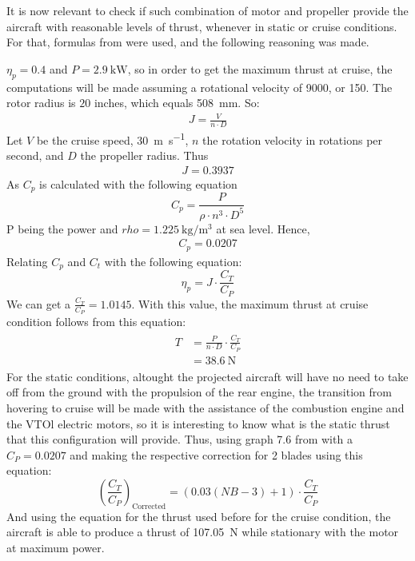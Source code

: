 \documentclass[english,fira]{ist-report}
\begin{document}
It is now relevant to check if such combination of motor and propeller provide the aircraft with reasonable levels of thrust, whenever in static or cruise conditions. For that, formulas from  \cite{corke} were used, and the following reasoning was made. 

$\eta_p=0.4$ and $P = \SI{2.9}{\kilo\watt}$, so in order to get the maximum thrust at cruise, the computations will be made assuming a rotational velocity of \SI{9000}{\rpm}, or \SI{150}{\rps}. The rotor radius is $20$ inches, which equals \SI{508}{\milli\meter}. So:
\begin{gather}
    J=\frac{V}{n \cdot D}
\end{gather}
Let $V$ be the cruise speed, \SI{30}{\meter\per\second}, $n$ the rotation velocity in rotations per second, and $D$ the propeller radius. Thus
\begin{gather}
    J=0.3937
\end{gather}
As $C_p$ is calculated with the following equation
\begin{equation}
    C_p=\frac{P}{\rho \cdot n^3 \cdot D^5}
\end{equation}
P being the power and $rho = \SI{1.225}{\kilogram\per\meter\cubed}$ at sea level. Hence,
\begin{gather}
    C_p=0.0207
\end{gather}
Relating $C_p$ and $C_t$ with the following equation:
\begin{equation}
    \eta_p=J \cdot \frac{C_T}{C_P}
\end{equation}
We can get a $\frac{C_T}{C_P}=1.0145$. With this value, the maximum thrust at cruise condition follows from this equation: 
\begin{align}
    \begin{aligned}
	    T&=\frac{P}{n \cdot D} \cdot \frac{C_T}{C_P} \\
	    &= \SI{38.6}{\newton}
	\end{aligned}
\end{align}
For the static conditions, altought the projected aircraft will have no need to take off from the ground with the propulsion of the rear engine, the transition from hovering to cruise will be made with the assistance of the combustion engine and the VTOl electric motors, so it is interesting to know what is the static thrust that this configuration will provide. Thus, using graph 7.6 from  \cite{corke} with a $C_P=0.0207$ and making the respective correction for 2 blades using this equation: 
\begin{equation}
	\left(\frac{C_T}{C_P}\right)_{\text{Corrected}}=\left(0.03(NB-3)+1\right) \cdot \frac{C_T}{C_P}
\end{equation}
And using the equation for the thrust used before for the cruise condition, the aircraft is able to produce a thrust of \SI{107.05}{\newton} while stationary with the motor at maximum power.
\end{document}
